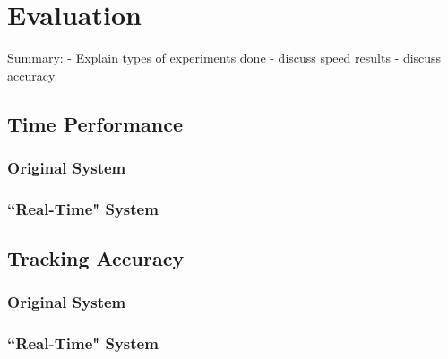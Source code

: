 \section{Evaluation}
\label{sec:eval}

Summary:
- Explain types of experiments done
- discuss speed results
- discuss accuracy

\subsection{Time Performance}
	\subsubsection{Original System}
	
	\subsubsection{``Real-Time" System}
	
\subsection{Tracking Accuracy}
	\subsubsection{Original System}
	
	\subsubsection{``Real-Time" System}